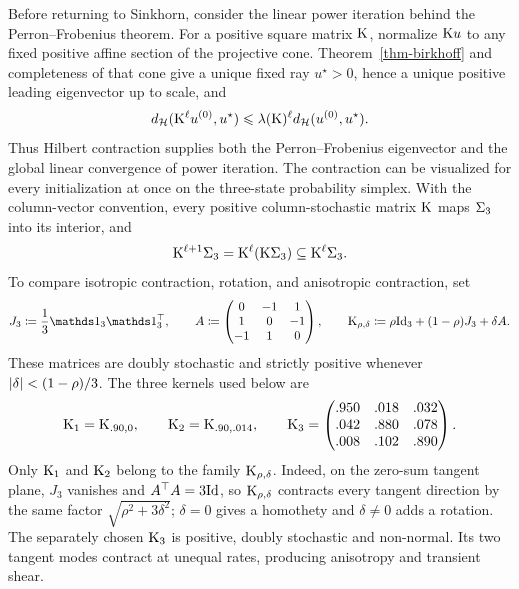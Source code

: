 Before returning to Sinkhorn, consider the linear power iteration behind the Perron--Frobenius theorem. For a positive square matrix $\mathrm{K}$, normalize $\mathrm{K} u$ to any fixed positive affine section of the projective cone. Theorem~\ref{thm-birkhoff} and completeness of that cone give a unique fixed ray $u^\star>0$, hence a unique positive leading eigenvector up to scale, and
\[
	d_{\mathcal{H}}(\mathrm{K}^\ell u^{(0)},u^\star)
	\leqslant
	\lambda(\mathrm{K})^\ell d_{\mathcal{H}}(u^{(0)},u^\star).
\]
Thus Hilbert contraction supplies both the Perron--Frobenius eigenvector and the global linear convergence of power iteration. The contraction can be visualized for every initialization at once on the three-state probability simplex. With the column-vector convention, every positive column-stochastic matrix $\mathrm{K}$ maps $\Sigma_3$ into its interior, and
\[
	\mathrm{K}^{\ell+1}\Sigma_3
	=
	\mathrm{K}^\ell(\mathrm{K}\Sigma_3)
	\subseteq
	\mathrm{K}^\ell\Sigma_3.
\]
To compare isotropic contraction, rotation, and anisotropic contraction, set
\[
	J_3\eqdef\frac{1}{3}\ones_3\ones_3^\top,
	\qquad
	A\eqdef
	\begin{pmatrix}
		0&-1&1\\
		1&0&-1\\
		-1&1&0
	\end{pmatrix},
	\qquad
	\K_{\rho,\delta}\eqdef \rho\Id_3+(1-\rho)J_3+\delta A.
\]
These matrices are doubly stochastic and strictly positive whenever $\left\lvert\delta\right\rvert<(1-\rho)/3$. The three kernels used below are
\[
	\mathrm{K}_1=\mathrm{K}_{.90,0},
	\qquad
	\mathrm{K}_2=\mathrm{K}_{.90,.014},
	\qquad
	\mathrm{K}_3=
	\begin{pmatrix}
		.950&.018&.032\\
		.042&.880&.078\\
		.008&.102&.890
	\end{pmatrix}.
\]
Only $\mathrm{K}_1$ and $\mathrm{K}_2$ belong to the family $\mathrm{K}_{\rho,\delta}$. Indeed, on the zero-sum tangent plane, $J_3$ vanishes and $A^\top A=3\mathrm{Id}$, so $\mathrm{K}_{\rho,\delta}$ contracts every tangent direction by the same factor $\sqrt{\rho^2+3\delta^2}$; $\delta=0$ gives a homothety and $\delta\neq0$ adds a rotation. The separately chosen $\mathrm{K}_3$ is positive, doubly stochastic and non-normal. Its two tangent modes contract at unequal rates, producing anisotropy and transient shear.


